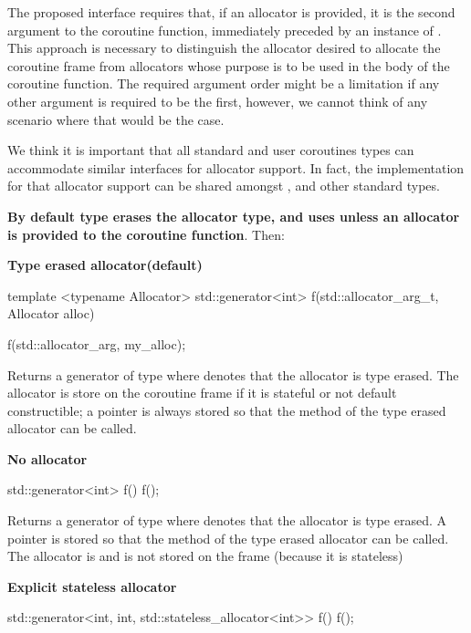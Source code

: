 \documentclass{wg21}
\begin{document}
The proposed interface requires that, if an allocator is provided, it is the second argument to the coroutine function, 
immediately preceded by an instance of .
This approach is necessary to distinguish the allocator desired to allocate the coroutine frame from allocators whose purpose is to be used in the body of the coroutine function.
The required argument order might be a limitation if any other argument is required to be the first, however, we cannot think of any scenario where that would be the case.

We think it is important that all standard and user coroutines types can accommodate similar interfaces for allocator support.
In fact, the implementation for that allocator support can be shared amongst ,  and other standard types.


\textbf{By default  type erases the allocator type, and uses  unless an allocator is provided to
the coroutine function}.
Then:

\textbf{Type erased allocator(default)}

\begin{colorblock}
template <typename Allocator>
std::generator<int> f(std::allocator_arg_t, Allocator alloc) {}

f(std::allocator_arg, my_alloc{});
\end{colorblock}

Returns a generator of type  where  denotes that the allocator is type erased.
The allocator is store on the coroutine frame if it is stateful or not default constructible; a pointer is always stored so that the  method of the type erased allocator can be called.


\textbf{No allocator}

\begin{colorblock}
std::generator<int> f() {}
f();
\end{colorblock}

Returns a generator of type  where  denotes that the allocator is type erased.
A pointer is stored so that the  method of the type erased allocator can be called. The allocator is  and is not stored on the frame (because it is stateless)

\textbf{Explicit stateless allocator}

\begin{colorblock}
std::generator<int, int, std::stateless_allocator<int>> f() {}
f();
\end{colorblock}
\end{document}
